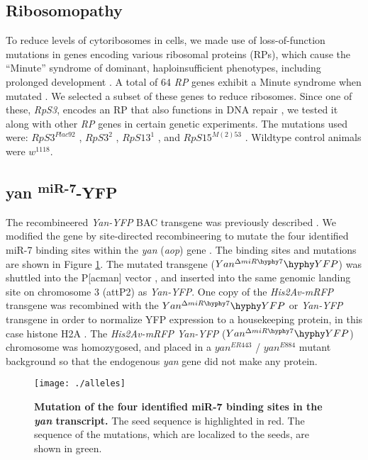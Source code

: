 \subsection{Ribosomopathy}

To reduce levels of cytoribosomes in cells, we made use of loss-of-function mutations in genes encoding various ribosomal proteins (RPs), which cause the ``Minute'' syndrome of dominant, haploinsufficient phenotypes, including prolonged development \cite{Sæbøelarssen1998}. A total of 64 \textit{RP} genes exhibit a Minute syndrome when mutated \cite{Marygold2007}. We selected a subset of these genes to reduce ribosomes. Since one of these, \textit{RpS3}, encodes an RP that also functions in DNA repair \cite{Graifer2014}, we tested it along with other \textit{RP} genes in certain genetic experiments. The mutations used were: $RpS3^{Plac92}$ \cite{Sæbøelarssen1998}, $RpS3^{2}$ \cite{Ferrus1975}, $RpS13^{1}$ \cite{Sæbøelarssen1998}, and $RpS15^{M(2)53}$ \cite{Golic1996}. Wildtype control animals were $w^{1118}$.

\subsection{yan \textsuperscript{\textDelta miR-7}-YFP}

The recombineered \textit{Yan-YFP} BAC transgene was previously described \cite{Webber2013}. We modified the gene by site-directed recombineering to mutate the four identified miR-7 binding sites within the \textit{yan} (\textit{aop}) gene \cite{Li2005}. The binding sites and mutations are shown in Figure \ref{fig:metabolism:alleles}. The mutated transgene ($Yan^{\Delta miR\hyphy 7}\hyphy YFP$) was shuttled into the P{[}acman{]} vector \cite{Venken2006}, and inserted into the same genomic landing site on chromosome 3 (attP2) as \textit{Yan-YFP}. One copy of the \textit{His2Av-mRFP} transgene was recombined with the $Yan^{\Delta miR\hyphy 7}\hyphy YFP$ or \textit{Yan-YFP} transgene in order to normalize YFP expression to a housekeeping protein, in this case histone H2A \cite{Pelaez2015a}. The \textit{His2Av-mRFP Yan-YFP} ($Yan^{\Delta miR\hyphy 7}\hyphy YFP$) chromosome was homozygosed, and placed in a $yan^{ER443}$ / $yan^{E884}$ mutant background so that the endogenous \textit{yan} gene did not make any protein.

\begin{figure}[h!]
\centering
\captionsetup{width=.65\linewidth}
\texttt{[image: ./alleles]}
\caption[Mutation of the four identified miR-7 binding sites in the \textit{yan} transcript.]{\textbf{Mutation of the four identified miR-7 binding sites in the \textit{yan} transcript.} The seed sequence is highlighted in red. The sequence of the mutations, which are localized to the seeds, are shown in green.}
\label{fig:metabolism:alleles}
\end{figure}

